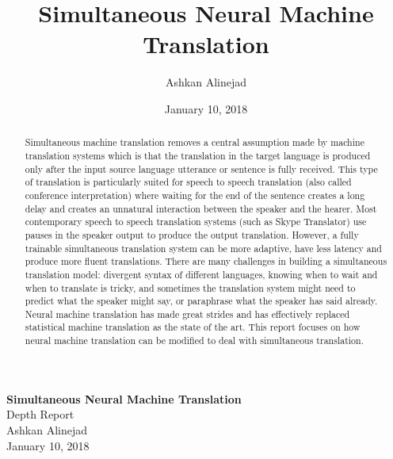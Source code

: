 \documentclass{sfuthesis}
\title{Simultaneous Neural Machine Translation}
\author{Ashkan Alinejad}
\date{January 10, 2018}
\begin{document}
\frontmatter

\pagebreak
\begin{titlingpage}
\hspace{0pt}
\vfill
\begin{center}
{\Large\bf Simultaneous Neural Machine Translation} \\
{\large Depth Report}\\
{\large Ashkan Alinejad}\\
{January 10, 2018}
\end{center}
\vfill
\hspace{0pt}
\end{titlingpage}
\pagebreak


\begin{abstract}
	Simultaneous machine translation removes a central assumption made by machine translation systems which is that the translation in the target language is produced only after the input source language utterance or sentence is fully received. This type of translation is particularly suited for speech to speech translation (also called conference interpretation) where waiting for the end of the sentence creates a long delay and creates an unnatural interaction between the speaker and the hearer. Most contemporary speech to speech translation systems (such as Skype Translator) use pauses in the speaker output to produce the output translation. However, a fully trainable simultaneous translation system can be more adaptive, have less latency and produce more fluent translations. There are many challenges in building a simultaneous translation model: divergent syntax of different languages, knowing when to wait and when to translate is tricky, and sometimes the translation system might need to predict what the speaker might say, or paraphrase what the speaker has said already. Neural machine translation has made great strides and has effectively replaced statistical machine translation as the state of the art. This report focuses on how neural machine translation can be modified to deal with simultaneous translation.
\end{abstract}




\end{document}
